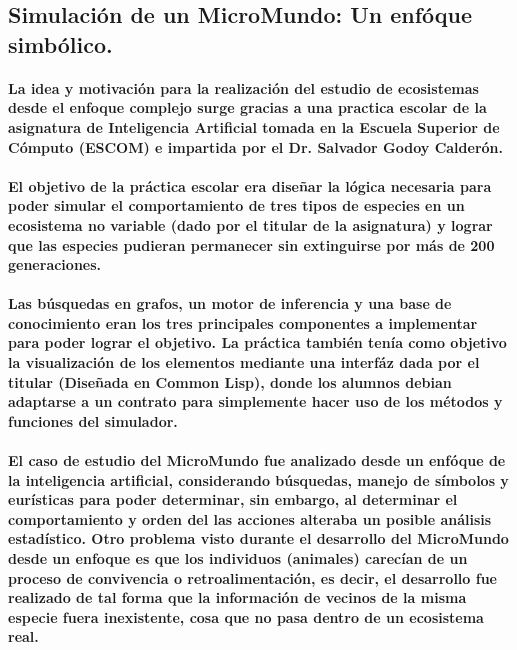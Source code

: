 \subsection{Simulación de un MicroMundo: Un enfóque simbólico.}
  \paragraph{La idea y motivación para la realización del estudio de ecosistemas desde el enfoque complejo surge gracias a una practica escolar de la asignatura de Inteligencia Artificial tomada en la Escuela Superior de Cómputo (ESCOM) e impartida por el Dr. Salvador Godoy Calderón.}
  \paragraph{El objetivo de la práctica escolar era diseñar la lógica necesaria para poder simular el comportamiento de tres tipos de especies en un ecosistema no variable (dado por el titular de la asignatura) y lograr que las especies pudieran permanecer sin extinguirse por más de 200 generaciones.}
  \paragraph{Las búsquedas en grafos, un motor de inferencia y una base de conocimiento eran los tres principales componentes a implementar para poder lograr el objetivo. La práctica también tenía como objetivo la visualización de los elementos mediante una interfáz dada por el titular (Diseñada en Common Lisp), donde los alumnos debian adaptarse a un contrato para simplemente hacer uso de los métodos y funciones del simulador.}
  \paragraph{El caso de estudio del MicroMundo fue analizado desde un enfóque de la inteligencia artificial, considerando búsquedas, manejo de símbolos y eurísticas para poder determinar, sin embargo, al determinar el comportamiento y orden del las acciones alteraba un posible análisis estadístico. Otro problema visto durante el desarrollo del MicroMundo desde un enfoque es que los individuos (animales) carecían de un proceso de convivencia o retroalimentación, es decir, el desarrollo fue realizado de tal forma que la información de vecinos de la misma especie fuera inexistente, cosa que no pasa dentro de un ecosistema real.}
